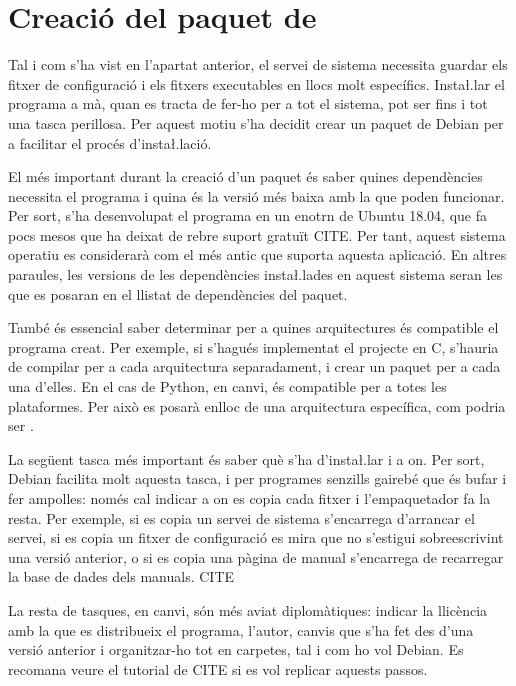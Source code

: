 \section{Creació del paquet de }

Tal i com s'ha vist en l'apartat anterior, el servei de sistema necessita guardar
els fitxer de configuració i els fitxers executables en llocs molt específics.
Insta\l.lar el programa a mà, quan es tracta de fer-ho per a tot el sistema,
pot ser fins i tot una tasca perillosa. Per aquest motiu s'ha decidit crear un
paquet de Debian per a facilitar el procés d'insta\l.lació.

El més important durant la creació d'un paquet és saber quines dependències
necessita el programa i quina és la versió més baixa amb la que poden funcionar.
Per sort, s'ha desenvolupat el programa en un enotrn de Ubuntu 18.04, que fa
pocs mesos que ha deixat de rebre suport gratuït CITE. Per tant, aquest sistema
operatiu es considerarà com el més antic que suporta aquesta aplicació. En altres
paraules, les versions de les dependències insta\l.lades en aquest sistema seran
les que es posaran en el llistat de dependències del paquet.

També és essencial saber determinar per a quines arquitectures és compatible el
programa creat. Per exemple, si s'hagués implementat el projecte en C, s'hauria
de compilar per a cada arquitectura separadament, i crear un paquet per a cada
una d'elles. En el cas de Python, en canvi, és compatible per a totes les
plataformes. Per això es posarà  enlloc de una arquitectura específica,
com podria ser .

La següent tasca més important és saber què s'ha d'insta\l.lar i a on. Per sort,
Debian facilita molt aquesta tasca, i per programes senzills gairebé que és
bufar i fer ampolles: només cal indicar a on es copia cada fitxer i l'empaquetador
fa la resta. Per exemple, si es copia un servei de sistema s'encarrega d'arrancar
el servei, si es copia un fitxer de configuració es mira que no s'estigui
sobreescrivint una versió anterior, o si es copia una pàgina de manual s'encarrega
de recarregar la base de dades dels manuals. CITE

La resta de tasques, en canvi, són més aviat diplomàtiques: indicar la llicència
amb la que es distribueix el programa, l'autor, canvis que s'ha fet des d'una
versió anterior i organitzar-ho tot en carpetes, tal i com ho vol Debian.
Es recomana veure el tutorial de CITE si es vol replicar aquests passos.

